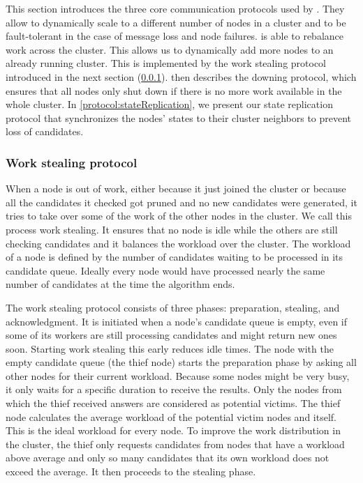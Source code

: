   This section introduces the three core communication protocols used by \dodo{}.
  They allow \dodo{} to dynamically scale to a different number of nodes in a cluster and to be fault-tolerant in the case of message loss and node failures.
  \dodo{} is able to rebalance work across the cluster.
  This allows us to dynamically add more nodes to an already running cluster.
  This is implemented by the work stealing protocol introduced in the next section (\cref{protocol:workStealing}).
   then describes the downing protocol, which ensures that all nodes only shut down if there is no more work available in the whole cluster.
  In \cref{protocol:stateReplication}, we present our state replication protocol that synchronizes the nodes' states to their cluster neighbors to prevent loss of candidates.

\subsubsection{Work stealing protocol}\label{protocol:workStealing}
  When a node is out of work, either because it just joined the cluster or because all the candidates it checked got pruned and no new candidates were generated, it tries to take over some of the work of the other nodes in the cluster.
  We call this process work stealing.
  It ensures that no node is idle while the others are still checking candidates and it balances the workload over the cluster.
  The workload of a node is defined by the number of candidates waiting to be processed in its candidate queue.
  Ideally every node would have processed nearly the same number of candidates at the time the algorithm ends.

  The work stealing protocol consists of three phases: preparation, stealing, and acknowledgment.
  It is initiated when a node's candidate queue is empty, even if some of its workers are still processing candidates and might return new ones soon.
  Starting work stealing this early reduces idle times.
  The node with the empty candidate queue (the thief node) starts the preparation phase by asking all other nodes for their current workload.
  Because some nodes might be very busy, it only waits for a specific duration to receive the results.
  Only the nodes from which the thief received answers are considered as potential victims.
  The thief node calculates the average workload of the potential victim nodes and itself.
  This is the ideal workload for every node.
  To improve the work distribution in the cluster, the thief only requests candidates from nodes that have a workload above average and only so many candidates that its own workload does not exceed the average.
  It then proceeds to the stealing phase.

